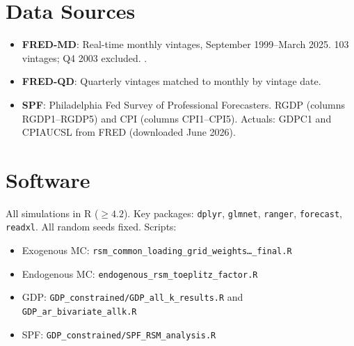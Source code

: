 \documentclass[12pt,a4paper]{article}
\theoremstyle{definition}
\begin{document}
\section{Data Sources}
\begin{itemize}[nosep]
\item \textbf{FRED-MD}: Real-time monthly vintages, September 1999--March
  2025. 103 vintages; Q4 2003 excluded. \citet{McCrackenNg2016}.
\item \textbf{FRED-QD}: Quarterly vintages matched to monthly by vintage date.
\item \textbf{SPF}: Philadelphia Fed Survey of Professional Forecasters.
  RGDP (columns RGDP1--RGDP5) and CPI (columns CPI1--CPI5).
  Actuals: GDPC1 and CPIAUCSL from FRED (downloaded June 2026).
\end{itemize}

\section{Software}
All simulations in R ($\geq4.2$). Key packages: \texttt{dplyr}, \texttt{glmnet},
\texttt{ranger}, \texttt{forecast}, \texttt{readxl}. All random seeds fixed.
Scripts:
\begin{itemize}[nosep]
\item Exogenous MC: \texttt{rsm\_common\_loading\_grid\_weights\ldots\_final.R}
\item Endogenous MC: \texttt{endogenous\_rsm\_toeplitz\_factor.R}
\item GDP: \texttt{GDP\_constrained/GDP\_all\_k\_results.R} and
  \texttt{GDP\_ar\_bivariate\_allk.R}
\item SPF: \texttt{GDP\_constrained/SPF\_RSM\_analysis.R}
\end{itemize}
\end{document}
